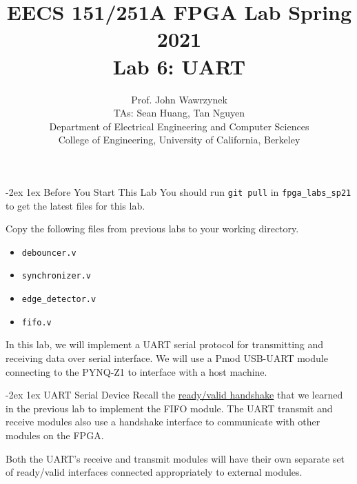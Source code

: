 \documentclass[11pt]{article}
\makeatletter
\renewcommand{\section}
{\@startsection {section}{1}{0pt}
 {-2ex}
 {1ex}
 {\bfseries\Large}}
\makeatother
\begin{document}
\def\PYZsq{\textquotesingle}
\title{\vspace{-0.4in}\Large \bf EECS 151/251A FPGA Lab Spring 2021\\
Lab 6: UART\vspace{-0.1in}}

\author{Prof. John Wawrzynek \\
TAs: Sean Huang, Tan Nguyen \\ Department of Electrical Engineering and Computer Sciences\\
College of Engineering, University of California, Berkeley}
\date{}
\maketitle

\section{Before You Start This Lab}
You should run \verb|git pull| in \verb|fpga_labs_sp21| to get the latest files for this lab.

Copy the following files from previous labs to your working directory.
\begin{itemize}
  \item \verb|debouncer.v|
  \item \verb|synchronizer.v|
  \item \verb|edge_detector.v|
  \item \verb|fifo.v|
\end{itemize}

In this lab, we will implement a UART serial protocol for transmitting and receiving data over serial interface. We will use a Pmod USB-UART module connecting to the PYNQ-Z1 to interface with a host machine.

\section{UART Serial Device}
Recall the \href{http://inst.eecs.berkeley.edu/~eecs151/sp21/files/verilog/ready_valid_interface.pdf}{ready/valid handshake} that we learned in the previous lab to implement the FIFO module. The UART transmit and receive modules also use a handshake interface to communicate with other modules on the FPGA.

Both the UART’s receive and transmit modules will have their own separate set of ready/valid interfaces connected appropriately to external modules.
\end{document}
